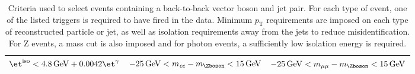 \documentclass[NOTE, atlasdraft=true, texlive=2016, USenglish]{\ATLASLATEXPATH atlasdoc}
\begin{document}
\begin{center}
\begin{table}
{\begin{tabular}{| l | l | l |}
	{\small $\et^{\text{iso}} < \SI{4.8}{GeV} + 0.0042\et^{\gamma}$}& {\small $\SI{-25}{\GeV} < m_{\textit{ee}} - m_{\Zboson} < \SI{15}{GeV}$} & {\small $\SI{-25}{\GeV} < m_{\mu\mu} - m_{\Zboson} < \SI{15}{GeV}$} \\ \hline
\end{tabular}
}
\caption{Criteria used to select events containing a back-to-back vector boson and jet pair. For each type of event, one of the listed triggers is required to have fired in the data. Minimum $p_{\text{T}}$ requirements are imposed on each type of reconstructed particle or jet, as well as isolation requirements away from the jets to reduce misidentification. For Z events, a mass cut is also imposed and for photon events, a sufficiently low isolation energy is required.}
\label{tab:eventSelection}
\end{table}
\end{center}
\end{document}
